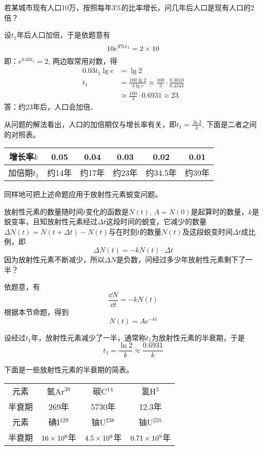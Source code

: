 \begin{example}
    若某城市现有人口10万，按照每年3\%的比率增长，问几年后人口是现有人口的2倍？
\end{example}

\begin{solution}
    设$t_1$年后人口加倍，于是依题意有
\[10e^{3\%t_1}=2\times10\]
即：$e^{0.03t_1}=2$, 两边取常用对数，得
\[\begin{split}
    0.03t_1\lg e&=\lg2\\
t_1&= \frac{100\lg2}{3\lg e}\approx \frac{100}{3}\cdot\frac{0.3010}{0. 4343}\\
&\approx \frac{100}{3}\cdot 0.6931\approx 23.
\end{split} \]
答：约23年后，人口会加倍．
\end{solution}

从问题的解法看出，人口的加倍期仅与增长率有关，即$t_1=\frac{\ln2}{k}$, 下面是二者之间的对照表。

\begin{center}
\begin{tabular}{c|ccccc}
\hline
    增长率$k$ & 0.05&0.04&0.03&0.02&0.01\\
\hline
加倍期$t_1$ & 约14年& 约17年& 约23年& 约34.5年& 约39年\\
\hline
        \end{tabular}
\end{center}

同样地可把上述命题应用于放射性元素蜕变问题。

\begin{example}
    放射性元素的数量随时间$t$变化的函数是$N(t)$, $A=N(0)$是起算时的数量，$k$是蜕变率，且知放射性元素经过$\Delta t$这段时间的蜕变，它减少的数量$\Delta N(t)=N(t+\Delta t)-N(t)$与在时刻$t$的数量$N(t)$及这段蜕变时间$\Delta t$成比
例，即
\[\Delta N (t) =-kN (t) \cdot \Delta t\]
因为放射性元素不断减少，所以$\Delta N$是负数，问经过多少年放射性元素剩下了一半？
\end{example}

\begin{solution}
    依题意，有
\[\frac{\dd N}{\dd t}=-kN (t) \]
根据本节命题，得到
\[N (t) =Ae^{-kt}\]

设经过$t_1$年，放射性元素减少了一半，通常称$t_1$为放射性元素的半衰期，于是
\[t_1=\frac{\ln 2}{k}\approx \frac{0. 6931}{k}\]
\end{solution}

下面是一些放射性元素的半衰期的简表。

\begin{center}
    \begin{tabular}{c|ccc}
    \hline
        元素 & 氩Ar$^{39}$ &碳C$^{14}$&氢H$^3$  \\
    半衰期 & 269年& 5730年& 12.3年 \\
    \hline
    元素 & 碘I$^{129}$ &铀U$^{238}$& 铀U$^{235}$ \\
    半衰期 &  $16\times10^6$年& $4.5\times 10^9$年& $0.71\times 10^9$年\\
    \hline
            \end{tabular}
    \end{center}

